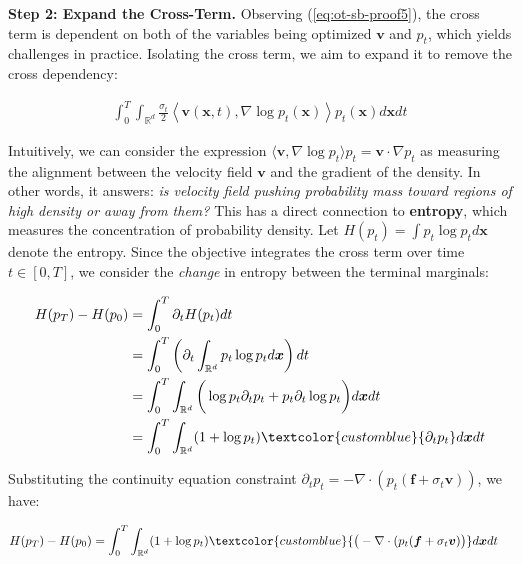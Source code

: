 \documentclass{article}
\newcommand{\bluetext}[1]{\textcolor{customblue}{#1}}
\begin{document}
\textbf{Step 2: Expand the Cross-Term. }
Observing (\ref{eq:ot-sb-proof5}), the cross term is dependent on both of the variables being optimized $\boldsymbol{v}$ and $p_t$, which yields challenges in practice. Isolating the cross term, we aim to expand it to remove the cross dependency:
\begin{small}
\begin{align}
    \int_0^T\int_{\mathbb{R}^d}\frac{\sigma_t}{2}\left\langle \boldsymbol{v}(\boldsymbol{x},t),\nabla\log p_t(\boldsymbol{x})\right\rangle p_t(\boldsymbol{x}) d\boldsymbol{x}dt\tag{Cross Term}
\end{align}
\end{small}
Intuitively, we can consider the expression $\langle\boldsymbol{v}, \nabla \log p_t\rangle p_t=\boldsymbol{v}\cdot \nabla p_t$ as measuring the alignment between the velocity field $\boldsymbol{v}$ and the gradient of the density. In other words, it answers: \textit{is velocity field pushing probability mass toward regions of high density or away from them?} This has a direct connection to \textbf{entropy}, which measures the concentration of probability density. Let $H(p_t)=\int p_t\log p_t d\boldsymbol{x}$ denote the entropy. Since the objective integrates the cross term over time $t\in [0,T]$, we consider the \textit{change} in entropy between the terminal marginals:
\begin{small}
\begin{align}
    H(p_T)-H(p_0)&=\int_0^T\partial_tH(p_t)dt\nonumber\\
    &=\int_0^T\left(\partial_t\int_{\mathbb{R}^d} p_t\log p_t d\boldsymbol{x}\right)dt\nonumber\\
    &=\int_0^T\int_{\mathbb{R}^d}\bigg(\log p_t\partial_tp_t+p_t\partial_t\log p_t\bigg)d\boldsymbol{x}dt\nonumber\\
    &=\int_0^T\int_{\mathbb{R}^d}(1+\log p_t)\bluetext{\partial_tp_t}d\boldsymbol{x}dt\label{eq:ot-sb-proof2}
\end{align}
\end{small}
Substituting the continuity equation constraint $\partial_tp_t=-\nabla\cdot(p_t(\boldsymbol{f}+\sigma_t\boldsymbol{v}))$, we have:
\begin{small}
\begin{align}
    H(p_T)-H(p_0)
    &=\int_0^T\int_{\mathbb{R}^d}(1+\log p_t)\bluetext{\big(-\nabla\cdot(p_t(\boldsymbol{f}+\sigma_t\boldsymbol{v})\big)}d\boldsymbol{x}dt\label{eq:ot-sb-proof3}
\end{align}
\end{small}
\end{document}
